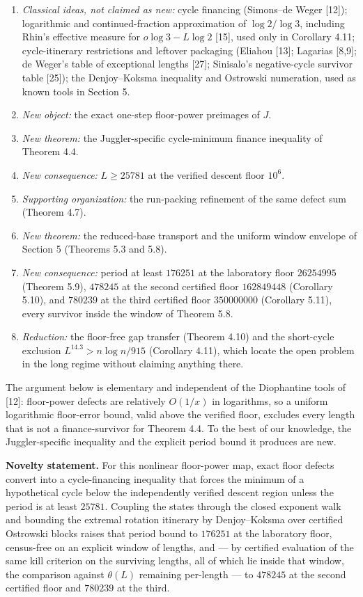 \documentclass[12pt]{article}
\providecommand{\tightlist}{\setlength{\itemsep}{0pt}\setlength{\parskip}{0pt}}
\begin{document}
\begin{enumerate}
\def\labelenumi{\arabic{enumi}.}
\tightlist
\item
  \emph{Classical ideas, not claimed as new:} cycle financing
  (Simons--de Weger {[}12{]}); logarithmic and continued-fraction
  approximation of \(\log 2/\log 3\), including Rhin's effective measure
  for \(o\log 3-L\log 2\) {[}15{]}, used only in Corollary 4.11;
  cycle-itinerary restrictions and leftover packaging (Eliahou {[}13{]};
  Lagarias {[}8,9{]}; de Weger's table of exceptional lengths {[}27{]};
  Sinisalo's negative-cycle survivor table {[}25{]}); the Denjoy--Koksma
  inequality and Ostrowski numeration, used as known tools in Section 5.
\item
  \emph{New object:} the exact one-step floor-power preimages of \(J\).
\item
  \emph{New theorem:} the Juggler-specific cycle-minimum finance
  inequality of Theorem 4.4.
\item
  \emph{New consequence:} \(L\ge 25781\) at the verified descent floor
  \(10^6\).
\item
  \emph{Supporting organization:} the run-packing refinement of the same
  defect sum (Theorem 4.7).
\item
  \emph{New theorem:} the reduced-base transport and the uniform window
  envelope of Section 5 (Theorems 5.3 and 5.8).
\item
  \emph{New consequence:} period at least \(176251\) at the laboratory
  floor \(26254995\) (Theorem 5.9), \(478245\) at the second certified
  floor \(162849448\) (Corollary 5.10), and \(780239\) at the third
  certified floor \(350000000\) (Corollary 5.11), every survivor inside
  the window of Theorem 5.8.
\item
  \emph{Reduction:} the floor-free gap transfer (Theorem 4.10) and the
  short-cycle exclusion \(L^{14.3}>n\log n/915\) (Corollary 4.11), which
  locate the open problem in the long regime without claiming anything
  there.
\end{enumerate}

The argument below is elementary and independent of the Diophantine
tools of {[}12{]}: floor-power defects are relatively \(O(1/x)\) in
logarithms, so a uniform logarithmic floor-error bound, valid above the
verified floor, excludes every length that is not a finance-survivor for
Theorem 4.4. To the best of our knowledge, the Juggler-specific
inequality and the explicit period bound it produces are new.

\textbf{Novelty statement.} For this nonlinear floor-power map, exact
floor defects convert into a cycle-financing inequality that forces the
minimum of a hypothetical cycle below the independently verified descent
region unless the period is at least \(25781\). Coupling the states
through the closed exponent walk and bounding the extremal rotation
itinerary by Denjoy--Koksma over certified Ostrowski blocks raises that
period bound to \(176251\) at the laboratory floor, census-free on an
explicit window of lengths, and --- by certified evaluation of the same
kill criterion on the surviving lengths, all of which lie inside that
window, the comparison against \(\theta(L)\) remaining per-length --- to
\(478245\) at the second certified floor and \(780239\) at the third.
\end{document}
